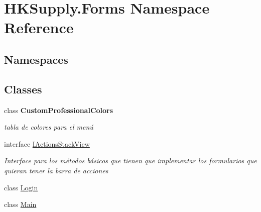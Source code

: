 \hypertarget{namespace_h_k_supply_1_1_forms}{}\section{H\+K\+Supply.\+Forms Namespace Reference}
\label{namespace_h_k_supply_1_1_forms}
\subsection*{Namespaces}
\begin{DoxyCompactItemize}
\end{DoxyCompactItemize}
\subsection*{Classes}
\begin{DoxyCompactItemize}
\item 
class {\bfseries Custom\+Professional\+Colors}
\begin{DoxyCompactList}\small\item\em tabla de colores para el menú \end{DoxyCompactList}\item 
interface \hyperlink{interface_h_k_supply_1_1_forms_1_1_i_actions_stack_view}{I\+Actions\+Stack\+View}
\begin{DoxyCompactList}\small\item\em Interface para los métodos básicos que tienen que implementar los formularios que quieran tener la barra de acciones \end{DoxyCompactList}\item 
class \hyperlink{class_h_k_supply_1_1_forms_1_1_login}{Login}
\item 
class \hyperlink{class_h_k_supply_1_1_forms_1_1_main}{Main}
\end{DoxyCompactItemize}
